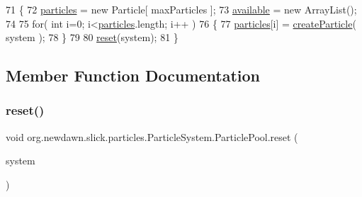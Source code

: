 \begin{DoxyCode}
71         \{
72             \mbox{\hyperlink{classorg_1_1newdawn_1_1slick_1_1particles_1_1_particle_system_1_1_particle_pool_a6b4dcf4ad8123ed1dd510d1e50ba7adf}{particles}} = \textcolor{keyword}{new} Particle[ maxParticles ];
73             \mbox{\hyperlink{classorg_1_1newdawn_1_1slick_1_1particles_1_1_particle_system_1_1_particle_pool_aec7206b9670d0a0826151c81b89f8681}{available}} = \textcolor{keyword}{new} ArrayList();
74             
75             \textcolor{keywordflow}{for}( \textcolor{keywordtype}{int} i=0; i<\mbox{\hyperlink{classorg_1_1newdawn_1_1slick_1_1particles_1_1_particle_system_1_1_particle_pool_a6b4dcf4ad8123ed1dd510d1e50ba7adf}{particles}}.length; i++ )
76             \{
77                 \mbox{\hyperlink{classorg_1_1newdawn_1_1slick_1_1particles_1_1_particle_system_1_1_particle_pool_a6b4dcf4ad8123ed1dd510d1e50ba7adf}{particles}}[i] = \mbox{\hyperlink{classorg_1_1newdawn_1_1slick_1_1particles_1_1_particle_system_ac03492cca10c01f7df6968e4293f65b7}{createParticle}}( system );
78             \}
79             
80             \mbox{\hyperlink{classorg_1_1newdawn_1_1slick_1_1particles_1_1_particle_system_1_1_particle_pool_a09cbcb1e4ef2844bb213923afedbf536}{reset}}(system);
81         \}
\end{DoxyCode}


\subsection{Member Function Documentation}
\mbox{\label{classorg_1_1newdawn_1_1slick_1_1particles_1_1_particle_system_1_1_particle_pool_a09cbcb1e4ef2844bb213923afedbf536}} 
\subsubsection{\texorpdfstring{reset()}{reset()}}
{\footnotesize\ttfamily void org.\+newdawn.\+slick.\+particles.\+Particle\+System.\+Particle\+Pool.\+reset (\begin{DoxyParamCaption}\item[{\mbox{\hyperlink{classorg_1_1newdawn_1_1slick_1_1particles_1_1_particle_system}{Particle\+System}}}]{system }\end{DoxyParamCaption})\hspace{0.3cm}{\ttfamily [inline]}}

